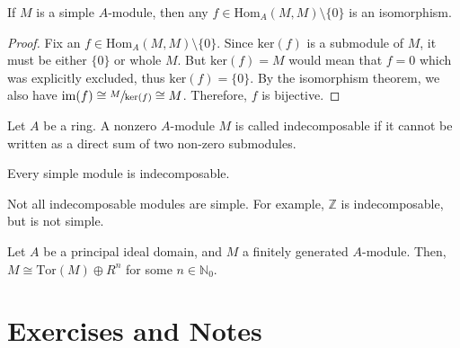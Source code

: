 \begin{example}
    If \(M\) is a simple \(A\)-module, then any \(f \in \mathrm{Hom}_A (M, M) \setminus \{0\}\) is an isomorphism.
\end{example}

\begin{proof}
    Fix an \(f \in \mathrm{Hom}_A (M, M) \setminus \{0\}\). Since \(\mathrm{ker}(f)\) is a submodule of \(M\), it must be either \(\{0\}\) or whole \(M\). But \(\mathrm{ker}(f) = M\) would mean that \(f = 0\) which was explicitly excluded, thus \(\mathrm{ker}(f) = \{0\}\). By the isomorphism theorem, we also have \(\mathrm{im}(f) \cong \sfrac{M}{\mathrm{ker}(f)} \cong M\). Therefore, \(f\) is bijective.
\end{proof}

\begin{defbox}
    \begin{definition}[Indecomposable]
        Let \(A\) be a ring. A nonzero \(A\)-module \(M\) is called indecomposable if it cannot be written as a direct sum of two non-zero submodules.
    \end{definition}
\end{defbox}

\begin{thmbox}
    \begin{proposition}
        Every simple module is indecomposable.
    \end{proposition}
\end{thmbox}

\begin{exmbox}
    \begin{example}
        Not all indecomposable modules are simple. For example, \(\mathbb{Z}\) is indecomposable, but is not simple.
    \end{example}
\end{exmbox}


\begin{thmbox}
    \begin{theorem}
        Let \(A\) be a principal ideal domain, and \(M\) a finitely generated \(A\)-module. Then, \(M \cong \mathrm{Tor}(M) \oplus R^n\) for some \(n \in \mathbb{N}_0\).
    \end{theorem}
\end{thmbox}

\newpage
\section{Exercises and Notes}

